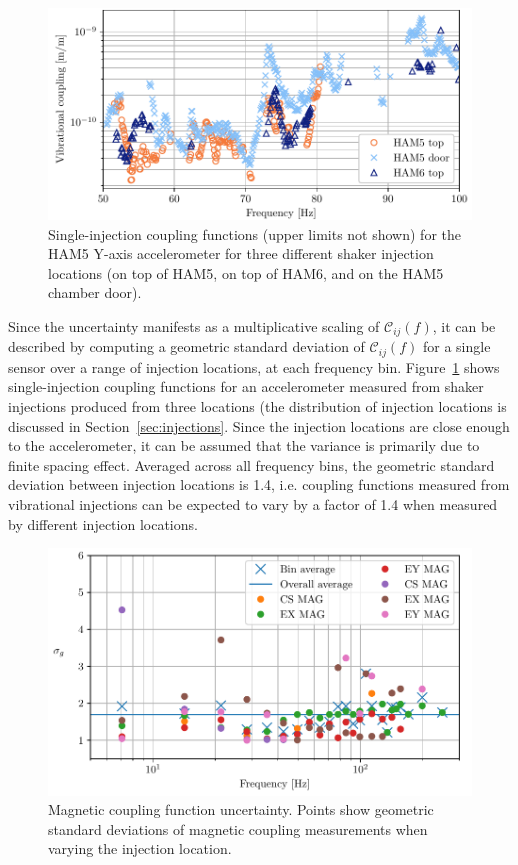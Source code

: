 \begin{figure}[h!]
	\centering
	\includegraphics{figures/noise-methods/cf-locations-vib.pdf}
	\caption{
		Single-injection coupling functions (upper limits not shown) for the HAM5 Y-axis accelerometer for three different shaker injection locations (on top of HAM5, on top of HAM6, and on the HAM5 chamber door).}
	\label{fig:cf-locations-vib}
\end{figure}

Since the uncertainty manifests as a multiplicative scaling of $\mathcal{C}_{ij}(f)$, it can be described by computing a geometric standard deviation of $\mathcal{C}_{ij}(f)$ for a single sensor over a range of injection locations, at each frequency bin.
Figure~\ref{fig:cf-locations-vib} shows single-injection coupling functions for an accelerometer measured from shaker injections produced from three locations (the distribution of injection locations is discussed in Section~\ref{sec:injections}.
Since the injection locations are close enough to the accelerometer, it can be assumed that the variance is primarily due to finite spacing effect.
Averaged across all frequency bins, the geometric standard deviation between injection locations is 1.4, i.e. coupling functions measured from vibrational injections can be expected to vary by a factor of 1.4 when measured by different injection locations.

\begin{figure}[h!]
	\centering
	\includegraphics{figures/noise-methods/cf-locations-mag.pdf}
	\caption[Magnetic coupling function uncertainty.]{
		Magnetic coupling function uncertainty.
		Points show geometric standard deviations of magnetic coupling measurements when varying the injection location.}
	\label{fig:cf-locations-mag}
\end{figure}

